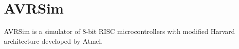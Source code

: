 \chapter{AVRSim} \label{chapter:avrsim}

AVRSim is a simulator of 8-bit RISC microcontrollers with modified
Harvard architecture developed by Atmel.
